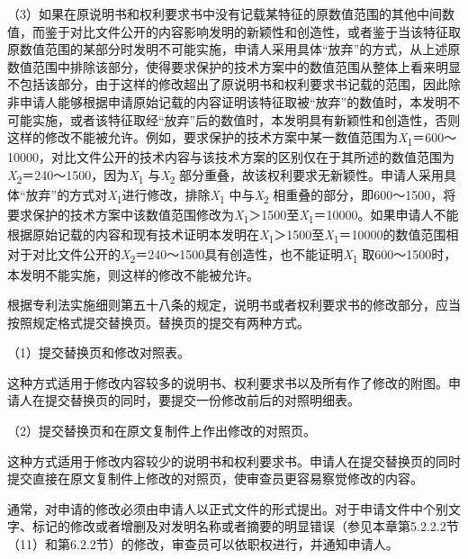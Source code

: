 {\setlength{\parindent}{17.1bp}（3）如果在原说明书和权利要求书中没有记载某特征的原数值范围的其他中间数值，而鉴于对比文件公开的内容影响发明的新颖性和创造性，或者鉴于当该特征取原数值范围的某部分时发明不可能实施，申请人采用具体“放弃”的方式，从上述原数值范围中排除该部分，使得要求保护的技术方案中的数值范围从整体上看来明显不包括该部分，由于这样的修改超出了原说明书和权利要求书记载的范围，因此除非申请人能够根据申请原始记载的内容证明该特征取被“放弃”的数值时，本发明不可能实施，或者该特征取经“放弃”后的数值时，本发明具有新颖性和创造性，否则这样的修改不能被允许。例如，要求保护的技术方案中某一数值范围为\textit{X}\textsubscript{1}＝600～10000，对比文件公开的技术内容与该技术方案的区别仅在于其所述的数值范围为\textit{X}\textsubscript{2}＝240～1500，因为\textit{X}\textsubscript{1} 与\textit{X}\textsubscript{2} 部分重叠，故该权利要求无新颖性。申请人采用具体“放弃”的方式对\textit{X}\textsubscript{1}进行修改，排除\textit{X}\textsubscript{1} 中与\textit{X}\textsubscript{2} 相重叠的部分，即600～1500，将要求保护的技术方案中该数值范围修改为\textit{X}\textsubscript{1}＞1500至\textit{X}\textsubscript{1}＝10000。如果申请人不能根据原始记载的内容和现有技术证明本发明在\textit{X}\textsubscript{1}＞1500至\textit{X}\textsubscript{1}＝10000的数值范围相对于对比文件公开的\textit{X}\textsubscript{2}＝240～1500具有创造性，也不能证明\textit{X}\textsubscript{1} 取600～1500时，本发明不能实施，则这样的修改不能被允许。\par}

根据专利法实施细则第五十八条的规定，说明书或者权利要求书的修改部分，应当按照规定格式提交替换页。替换页的提交有两种方式。

{\setlength{\parindent}{17.1bp}（1）提交替换页和修改对照表。\par}

这种方式适用于修改内容较多的说明书、权利要求书以及所有作了修改的附图。申请人在提交替换页的同时，要提交一份修改前后的对照明细表。

{\setlength{\parindent}{17.1bp}（2）提交替换页和在原文复制件上作出修改的对照页。\par}

这种方式适用于修改内容较少的说明书和权利要求书。申请人在提交替换页的同时提交直接在原文复制件上修改的对照页，使审查员更容易察觉修改的内容。

通常，对申请的修改必须由申请人以正式文件的形式提出。对于申请文件中个别文字、标记的修改或者增删及对发明名称或者摘要的明显错误（参见本章第5.2.2.2节（11）和第6.2.2节）的修改，审查员可以依职权进行，并通知申请人。


